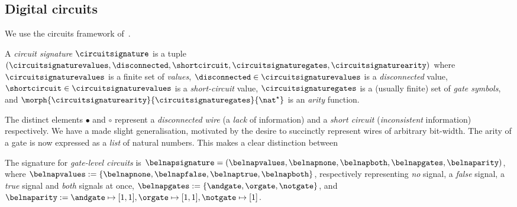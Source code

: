 
\subsection{Digital circuits}

We use the circuits framework of~\cite{ghica2022compositional}.

\begin{definition}
    A \emph{circuit signature} \(\circuitsignature\) is a tuple \((
        \circuitsignaturevalues,
        \disconnected,
        \shortcircuit,
        \circuitsignaturegates,
        \circuitsignaturearity
    )\) where \(\circuitsignaturevalues\) is a finite set of \emph{values}, \(
        \disconnected \in \circuitsignaturevalues
    \) is a \emph{disconnected} value, \(
        \shortcircuit \in \circuitsignaturevalues
    \) is a \emph{short-circuit} value, \(
        \circuitsignaturegates
    \) is a (usually finite) set of \emph{gate symbols}, and \(
        \morph{\circuitsignaturearity}{\circuitsignaturegates}{\nat^\star}
    \) is an \emph{arity} function.
\end{definition}

The distinct elements \(\bullet\) and \(\circ\) represent a
\emph{disconnected wire} (a \emph{lack} of information) and a
\emph{short circuit} (\emph{inconsistent} information) respectively.
We have a made slight generalisation, motivated by the desire to succinctly
represent wires of arbitrary bit-width.
The arity of a gate is now expressed as a \emph{list} of natural numbers.
This makes a clear distinction between

\begin{example}\label{ex:sig}
    The signature for \emph{gate-level circuits} is \(
        \belnapsignature = (
            \belnapvalues,
            \belnapnone,
            \belnapboth,
            \belnapgates,
            \belnaparity
    )\), where \(
        \belnapvalues := \{\belnapnone, \belnapfalse, \belnaptrue, \belnapboth\}
    \), respectively representing \emph{no} signal, a \emph{false} signal, a
        \emph{true} signal and \emph{both} signals at once, \(
        \belnapgates := \{\andgate,\orgate,\notgate\}
    \), and \(
        \belnaparity :=
            \andgate \mapsto [1, 1],
            \orgate \mapsto [1, 1],
            \notgate \mapsto [1]
    \).
\end{example}

